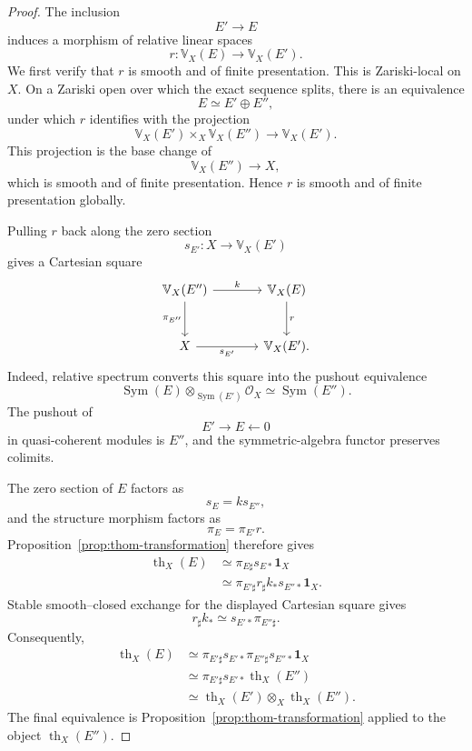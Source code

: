 \begin{proof}
The inclusion
\[
    E'\longrightarrow E
\]
induces a morphism of relative linear spaces
\[
    r:
    \mathbb V_X(E)
    \longrightarrow
    \mathbb V_X(E').
\]
We first verify that \(r\) is smooth and of finite presentation.  This is
Zariski-local on \(X\).  On a Zariski open over which the exact sequence
splits, there is an equivalence
\[
    E\simeq E'\oplus E'',
\]
under which \(r\) identifies with the projection
\[
    \mathbb V_X(E')
    \times_X
    \mathbb V_X(E'')
    \longrightarrow
    \mathbb V_X(E').
\]
This projection is the base change of
\[
    \mathbb V_X(E'')
    \longrightarrow
    X,
\]
which is smooth and of finite presentation.  Hence \(r\) is smooth and of
finite presentation globally.

Pulling \(r\) back along the zero section
\[
    s_{E'}:
    X
    \longrightarrow
    \mathbb V_X(E')
\]
gives a Cartesian square
\[
\begin{tikzcd}[column sep=large,row sep=large]
    \mathbb V_X(E'') \arrow[r,"k"] \arrow[d,"\pi_{E''}"']
        & \mathbb V_X(E) \arrow[d,"r"] \\
    X \arrow[r,"s_{E'}"']
        & \mathbb V_X(E').
\end{tikzcd}
\]
Indeed, relative spectrum converts this square into the pushout equivalence
\[
    \operatorname{Sym}(E)
    \otimes_{\operatorname{Sym}(E')}
    \mathcal O_X
    \simeq
    \operatorname{Sym}(E'').
\]
The pushout of
\[
    E'\longrightarrow E\longleftarrow0
\]
in quasi-coherent modules is \(E''\), and the symmetric-algebra functor
preserves colimits.

The zero section of \(E\) factors as
\[
    s_E=ks_{E''},
\]
and the structure morphism factors as
\[
    \pi_E=\pi_{E'}r.
\]
Proposition~\ref{prop:thom-transformation} therefore gives
\[
\begin{aligned}
    \operatorname{th}_X(E)
    &\simeq
    \pi_{E\sharp}s_{E*}\mathbf1_X \\
    &\simeq
    \pi_{E'\sharp}
    r_\sharp
    k_*
    s_{E''*}\mathbf1_X.
\end{aligned}
\]
Stable smooth--closed exchange for the displayed Cartesian square gives
\[
    r_\sharp k_*
    \simeq
    s_{E'*}\pi_{E''\sharp}.
\]
Consequently,
\[
\begin{aligned}
    \operatorname{th}_X(E)
    &\simeq
    \pi_{E'\sharp}
    s_{E'*}
    \pi_{E''\sharp}
    s_{E''*}\mathbf1_X \\
    &\simeq
    \pi_{E'\sharp}
    s_{E'*}
    \operatorname{th}_X(E'') \\
    &\simeq
    \operatorname{th}_X(E')
    \otimes_X
    \operatorname{th}_X(E'').
\end{aligned}
\]
The final equivalence is Proposition~\ref{prop:thom-transformation} applied
to the object \(\operatorname{th}_X(E'')\).


\end{proof}

